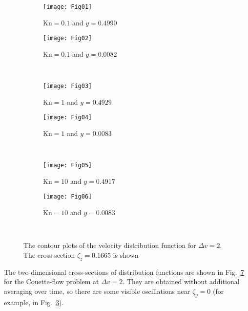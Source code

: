 \documentclass[aip,pof,preprint]{revtex4-1}
\newcommand{\Kn}{\mathrm{Kn}}
\begin{document}
\begin{figure}
    \vspace{-24pt}
    \centering
    \begin{subfigure}[b]{.5\linewidth}
        \texttt{[image: Fig01]}
        \caption{\(\Kn=0.1\) and \(y=0.4990\)}
        \label{fig:distrib-kn0.1:boundary}
    \end{subfigure}%
    \begin{subfigure}[b]{.5\linewidth}
        \texttt{[image: Fig02]}
        \caption{\(\Kn=0.1\) and \(y=0.0082\)}
        \label{fig:distrib-kn0.1:center}
    \end{subfigure}\\
    \begin{subfigure}[b]{.5\linewidth}
        \texttt{[image: Fig03]}
        \caption{\(\Kn=1\) and \(y=0.4929\)}
        \label{fig:distrib-kn1.0:boundary}
    \end{subfigure}%
    \begin{subfigure}[b]{.5\linewidth}
        \texttt{[image: Fig04]}
        \caption{\(\Kn=1\) and \(y=0.0083\)}
        \label{fig:distrib-kn1.0:center}
    \end{subfigure}\\
    \begin{subfigure}[b]{.5\linewidth}
        \texttt{[image: Fig05]}
        \caption{\(\Kn=10\) and \(y=0.4917\)}
        \label{fig:distrib-kn10:boundary}
    \end{subfigure}%
    \begin{subfigure}[b]{.5\linewidth}
        \texttt{[image: Fig06]}
        \caption{\(\Kn=10\) and \(y=0.0083\)}
        \label{fig:distrib-kn10:center}
    \end{subfigure}\\
    \caption{The contour plots of the velocity distribution function for \(\Delta{v}=2\).
        The cross-section \(\zeta_z=0.1665\) is shown}
    \label{fig:distrib}
\end{figure}

The two-dimensional cross-sections of distribution functions are shown
in Fig.~\ref{fig:distrib} for the Couette-flow problem at \(\Delta{v}=2\).
They are obtained without additional averaging over time,
so there are some visible oscillations near \(\zeta_y=0\)
(for example, in Fig.~\ref{fig:distrib-kn1.0:boundary}).
\end{document}
